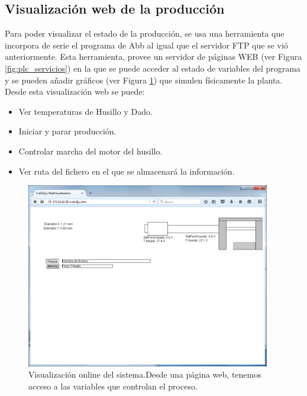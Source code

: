 \subsection{Visualización web de la producción}
\label{sec:plc_scada}

Para poder visualizar el estado de la producción, se usa una herramienta que incorpora de serie el programa de Abb al igual que el servidor FTP que se vió anteriormente. Esta herramienta, provee un servidor de páginas WEB (ver Figura \ref{fig:plc_servicios}) en la que se puede acceder al estado de variables del programa y se pueden añadir gráficos (ver Figura \ref{fig:plc_visu_web}) que simulen físicamente la planta. Desde esta visualización web se puede:

\begin{itemize}
    \item {Ver temperaturas de Husillo y Dado.}
    \item {Iniciar y parar producción.}
    \item {Controlar marcha del motor del husillo.}
    \item {Ver ruta del fichero en el que se almacenará la información.}
\end{itemize}

\begin{figure}[H]
    \centering
    \includegraphics[width=0.95\textwidth]{images/PLC/visu_online.png}
    \caption[Visualización online del sistema.]{Visualización online del sistema.Desde una página web, tenemos acceso a las variables que controlan el proceso.}
    \label{fig:plc_visu_web}
\end{figure}

